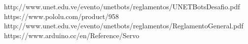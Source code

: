 \documentclass[conference]{IEEEtran}
\begin{document}
\bigskip
\begin{thebibliography}{1}

\bigskip
{} http://www.unet.edu.ve/evento/unetbots/reglamentos/UNETBotsDesafio.pdf
https://www.pololu.com/product/958
 http://www.unet.edu.ve/evento/unetbots/reglamentos/ReglamentoGeneral.pdf
https://www.arduino.cc/en/Reference/Servo




\end{thebibliography}
\end{document}
